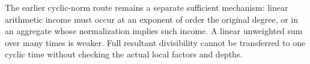 The earlier cyclic-norm route remains a separate sufficient mechanism: linear arithmetic income must occur at an exponent of order the original degree, or in an aggregate whose normalization implies such income.
A linear unweighted sum over many times is weaker.
Full resultant divisibility cannot be transferred to one cyclic time without checking the actual local factors and depths.
